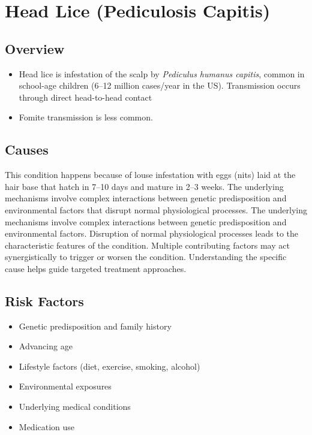 \chapter{Head Lice (Pediculosis Capitis)}
\label{sec:Head Lice}

\section{Overview}


\begin{itemize}[noitemsep]
  \item Head lice is infestation of the scalp by \textit{Pediculus humanus capitis}, common in school-age children (6--12 million cases/year in the US). Transmission occurs through direct head-to-head contact
  \item Fomite transmission is less common.
\end{itemize}
\section{Causes}
This condition happens because of louse infestation with eggs (nits) laid at the hair base that hatch in 7--10 days and mature in 2--3 weeks. The underlying mechanisms involve complex interactions between genetic predisposition and environmental factors that disrupt normal physiological processes. The underlying mechanisms involve complex interactions between genetic predisposition and environmental factors. Disruption of normal physiological processes leads to the characteristic features of the condition. Multiple contributing factors may act synergistically to trigger or worsen the condition. Understanding the specific cause helps guide targeted treatment approaches.
\section{Risk Factors}


\begin{itemize}[noitemsep]
  \item Genetic predisposition and family history
  \item Advancing age
  \item Lifestyle factors (diet, exercise, smoking, alcohol)
  \item Environmental exposures
  \item Underlying medical conditions
  \item Medication use
\end{itemize}
